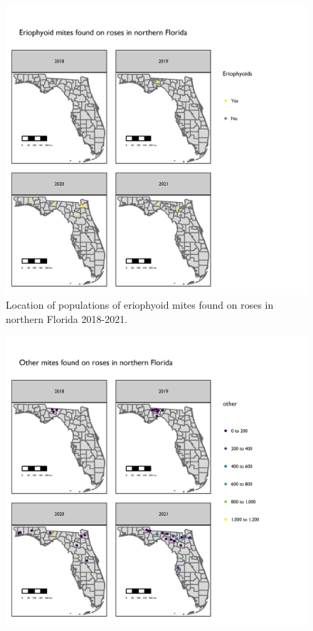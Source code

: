 \documentclass{ufdissertation}[overrideChapters] %
\begin{document}
{\begin{figure}[p]
{\centering \includegraphics[width=1\linewidth]{figure/rrv_survey_map_years_pf} 

}

\caption[Location of populations of eriophyoid mites found on roses in northern Florida]{Location of populations of eriophyoid mites found on roses in northern Florida 2018-2021.}\label{fig:survey-map-3}
\end{figure}
\begin{figure}[p]

{\centering \includegraphics[width=1\linewidth]{figure/rrv_survey_map_years_others} 

}
\end{figure}}
\end{document}
